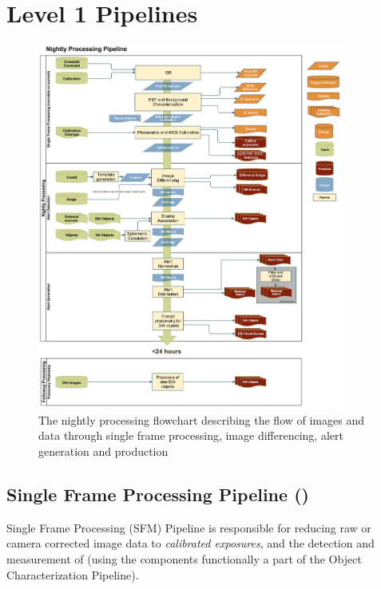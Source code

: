 \section{Level 1 Pipelines}
\label{sec:ap}

\begin{figure}[th]
\begin{center}
\includegraphics[width=0.9\textwidth]{figures/Level_1_Processing_Flowchart.jpg}
\caption{\label{fig:nightly} The nightly processing flowchart
  describing the flow of images and data through single frame
  processing, image differencing, alert generation and production}
\end{center}
\end{figure}

\subsection{Single Frame Processing Pipeline (\wbsSFM)}
\label{sec:apSingleFrameProcessing}

Single Frame Processing (SFM) Pipeline is responsible for reducing raw
or camera corrected image data to \emph{calibrated exposures}, and the
detection and measurement of \Sources (using the components
functionally a part of the Object Characterization Pipeline).

